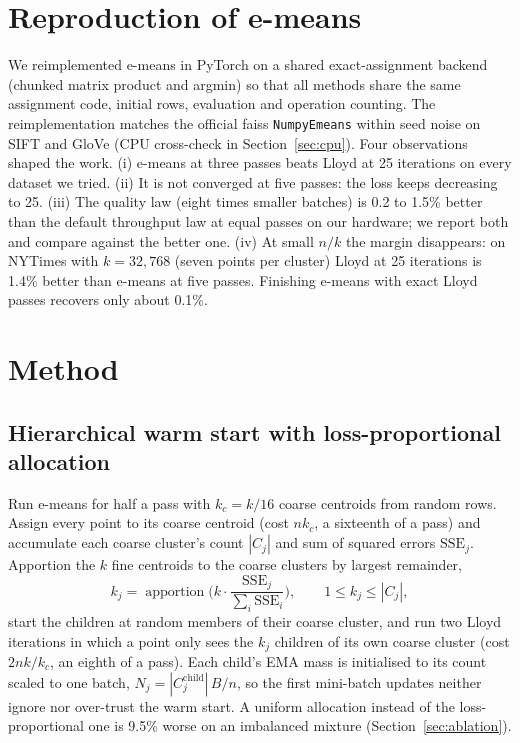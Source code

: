\documentclass[11pt]{article}
\newcommand{\emeans}{e-means}
\newcommand{\nk}{n/k}
\begin{document}
\section{Reproduction of \emeans{}}
\label{sec:repro}

We reimplemented \emeans{} in PyTorch on a shared exact-assignment backend (chunked matrix product and argmin) so that all methods share the same assignment code, initial rows, evaluation and operation counting. The reimplementation matches the official faiss \texttt{NumpyEmeans} within seed noise on SIFT and GloVe (CPU cross-check in Section~\ref{sec:cpu}). Four observations shaped the work. (i) \emeans{} at three passes beats Lloyd at 25 iterations on every dataset we tried. (ii) It is not converged at five passes: the loss keeps decreasing to 25. (iii) The quality law (eight times smaller batches) is 0.2 to 1.5\% better than the default throughput law at equal passes on our hardware; we report both and compare against the better one. (iv) At small $\nk$ the margin disappears: on NYTimes with $k=32{,}768$ (seven points per cluster) Lloyd at 25 iterations is 1.4\% better than \emeans{} at five passes. Finishing \emeans{} with exact Lloyd passes recovers only about 0.1\%.

\section{Method}
\label{sec:method}

\subsection{Hierarchical warm start with loss-proportional allocation}

Run \emeans{} for half a pass with $k_c = k/16$ coarse centroids from random rows. Assign every point to its coarse centroid (cost $n k_c$, a sixteenth of a pass) and accumulate each coarse cluster's count $|C_j|$ and sum of squared errors $\mathrm{SSE}_j$. Apportion the $k$ fine centroids to the coarse clusters by largest remainder,
\begin{equation}
k_j = \operatorname{apportion}\Big(k\cdot \frac{\mathrm{SSE}_j}{\sum_i \mathrm{SSE}_i}\Big), \qquad 1 \le k_j \le |C_j|,
\end{equation}
start the children at random members of their coarse cluster, and run two Lloyd iterations in which a point only sees the $k_j$ children of its own coarse cluster (cost $2 n k / k_c$, an eighth of a pass). Each child's EMA mass is initialised to its count scaled to one batch, $N_j = |C_j^{\mathrm{child}}|\,B/n$, so the first mini-batch updates neither ignore nor over-trust the warm start. A uniform allocation instead of the loss-proportional one is 9.5\% worse on an imbalanced mixture (Section~\ref{sec:ablation}).
\end{document}
